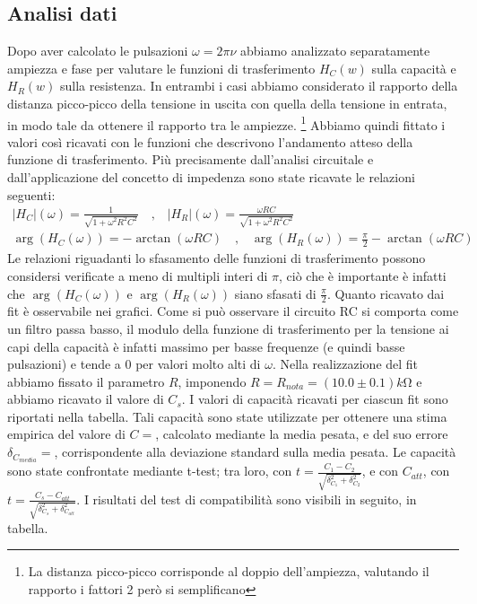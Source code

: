 \documentclass[a4paper]{article}
\begin{document}
\subsection{Analisi dati}
Dopo aver calcolato le pulsazioni $\omega=2\pi \nu$ abbiamo analizzato separatamente ampiezza e fase per valutare le funzioni di trasferimento $H_C(w)$ sulla capacità e $H_R(w)$ sulla resistenza. In entrambi i casi abbiamo considerato il rapporto della distanza picco-picco della tensione in uscita con quella della tensione in entrata, in modo tale da ottenere il rapporto tra le ampiezze. \footnote{La distanza picco-picco corrisponde al doppio dell'ampiezza, valutando il rapporto i fattori 2 però si semplificano}
Abbiamo quindi fittato i valori così ricavati con le funzioni che descrivono l'andamento atteso della funzione di trasferimento. Più precisamente dall'analisi circuitale e dall'applicazione del concetto di impedenza sono state ricavate le relazioni seguenti:
\begin{align}
|H_C|(\omega) = \frac{1}{\sqrt{1 + \omega^2R^2C^2}} \quad \text{,} \quad |H_R|(\omega) = \frac{\omega RC}{\sqrt{1 + \omega^2R^2C^2}}
\label{eq:ampiezza RC}\\
\arg(H_C(\omega)) = -\arctan(\omega RC) \quad \text{,} \quad \arg(H_R(\omega)) = \frac{\pi}{2}-\arctan(\omega RC)
\label{eq: fase RC}
\end{align}
Le relazioni riguadanti lo sfasamento delle funzioni di trasferimento possono considersi verificate a meno di multipli interi di $\pi$, ciò che è importante è infatti che $\arg(H_C(\omega))$ e $\arg(H_R(\omega))$ siano sfasati di $\frac{\pi}{2}$.
Quanto ricavato dai fit è osservabile nei grafici.
Come si può osservare il circuito RC si comporta come un filtro passa basso, il modulo della funzione di trasferimento per la tensione ai capi della capacità è infatti massimo per basse frequenze (e quindi basse pulsazioni) e tende a 0 per valori molto alti di $\omega$.
Nella realizzazione del fit abbiamo fissato il parametro $R$, imponendo $R =R_{nota} = (10.0\pm 0.1) k\si{\ohm}$ e abbiamo ricavato il valore di $C_s$. 
I valori di capacità ricavati per ciascun fit sono riportati nella tabella.
Tali capacità sono state utilizzate per ottenere una stima empirica del valore di $C=$, calcolato mediante la media pesata, e del suo errore $\delta_{C_{media}}=$, corrispondente alla deviazione standard sulla media pesata.
Le capacità sono state confrontate mediante t-test; tra loro, con \( t = \frac {C_1 - C_2}{\sqrt{\delta_{C_1}^2+\delta_{C_2}^2}} \), e con $C_{att}$, con \( t = \frac {C_s - C_{att}}{\sqrt{\delta_{C_s}^2+\delta_{C_{att}}^2}} \). I risultati del test di compatibilità sono visibili in seguito, in tabella.
\end{document}
